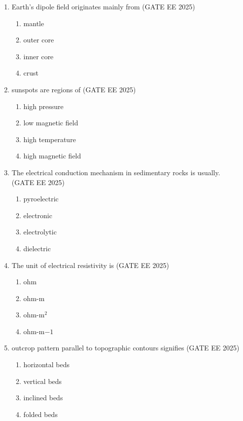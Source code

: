 \documentclass[journal]{IEEEtran}
\begin{document}
\begin{enumerate}[start=1]
\item Earth's dipole field originates mainly from
\hfill{(GATE EE 2025)}
\begin{enumerate}
\item mantle
\item outer core
\item inner core
\item crust
\end{enumerate}

\item  sunspots are regions of
\hfill{(GATE EE 2025)}
\begin{enumerate}
\item high pressure
\item low magnetic field
\item high temperature
\item high magnetic field
\end{enumerate}

\item  The electrical conduction mechanism in  sedimentary rocks is usually.\\
\hfill{(GATE EE 2025)}

\begin{enumerate}
\item pyroelectric
\item electronic
\item electrolytic
\item dielectric
\end{enumerate}


\item  The unit of electrical resistivity is
\hfill{(GATE EE 2025)}
\begin{enumerate}
\item ohm
\item ohm-m
\item ohm-m$^2$
\item ohm-m$-1$
\end{enumerate}


\item  outcrop pattern parallel to topographic contours signifies
\hfill{(GATE EE 2025)}
\begin{enumerate}
    \item horizontal beds
    \item vertical beds
    \item inclined beds
    \item folded beds
\end{enumerate}


\end{enumerate}
\end{document}
